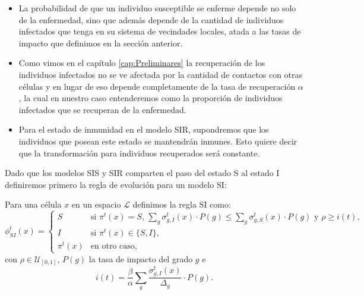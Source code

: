 \begin{itemize}
    \item La probabilidad de que un individuo susceptible se enferme depende no solo de la enfermedad, sino que además depende de la cantidad de individuos infectados que tenga en su sistema de vecindades locales, atada a las tasas de impacto que definimos en la sección anterior. 
    \item Como vimos en el capítulo \ref{cap:Preliminares} la recuperación de los individuos infectados no se ve afectada por la cantidad de contactos con otras células y en lugar de eso depende completamente de la tasa de recuperación $\alpha$, la cual en nuestro caso entenderemos como la proporción de individuos infectados que se recuperan de la enfermedad.
    \item Para el estado de inmunidad en el modelo SIR, supondremos que los individuos que posean este estado se mantendrán inmunes. Esto quiere decir que la transformación para individuos recuperados será constante.
\end{itemize}

Dado que los modelos SIS y SIR comparten el paso del estado S al estado I definiremos primero la regla de evolución para un modelo SI:

\begin{definition}\label{def:reglaSI}
Para una célula $x$ en un espacio $\mathcal{L}$ definimos la regla SI como:
\begin{equation}
    \phi_{SI}^t(x)=\left\{\begin{array}{ll}
        S & \text{si }\pi^t(x)=S\text{, }\sum_g{\sigma_{g,I}^t(x)\cdot P(g)}\leq \sum_g{\sigma_{g,S}^t(x)\cdot P(g)}\text{ y }\rho\geq i(t),\\
        I & \text{si }\pi^t(x)\in\{S,I\}\text{,} \\
        \pi^t(x) & \text{en otro caso,}
    \end{array}\right.
\end{equation}
con $\rho\in\mathcal{U}_{[0,1]}$, $P(g)$ la tasa de impacto del grado $g$ e
\begin{equation}
    i(t) = \frac{\beta}{\alpha}\sum_g{\frac{\sigma_{g,I}^t(x)}{\Delta_g}}\cdot P(g).
\end{equation}
\end{definition}

